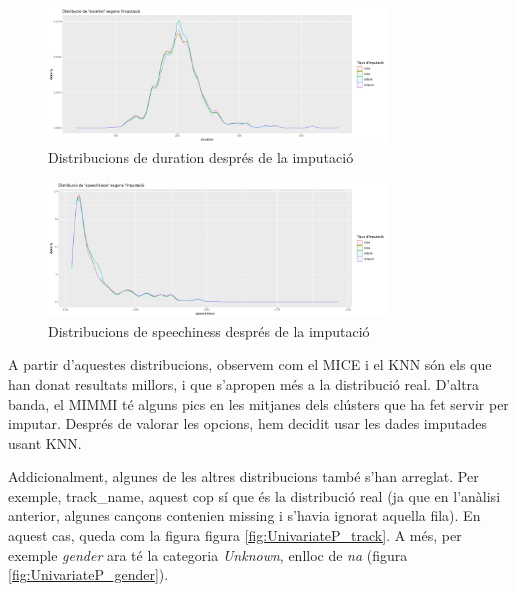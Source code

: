 \begin{figure}[H]
    \centering
    \includegraphics[width=0.8\textwidth]{Images/3_Preprocessing/distrib_imputation_duration.png}
    \caption{Distribucions de duration després de la imputació}
    \label{fig:Preprocessing_distribduration}
\end{figure}

\begin{figure}[H]
    \centering
    \includegraphics[width=0.8\textwidth]{Images/3_Preprocessing/distrib_imputation_speechiness.png}
    \caption{Distribucions de speechiness després de la imputació}
    \label{fig:Preprocessing_distribspeech}
\end{figure}

A partir d'aquestes distribucions, observem com el MICE i el KNN són els que han donat resultats millors, i que s'apropen més a la distribució real. D'altra banda, el MIMMI té alguns pics en les mitjanes dels clústers que ha fet servir per imputar. Després de valorar les opcions, hem decidit usar les dades imputades usant KNN.

Addicionalment, algunes de les altres distribucions també s'han arreglat. Per exemple, track\_name, aquest cop sí que és la distribució real (ja que en l'anàlisi anterior, algunes cançons contenien missing i s'havia ignorat aquella fila). En aquest cas, queda com la figura figura \ref{fig:UnivariateP_track}. A més, per exemple \textit{gender} ara té la categoria \textit{Unknown}, enlloc de \textit{na} (figura \ref{fig:UnivariateP_gender}).

